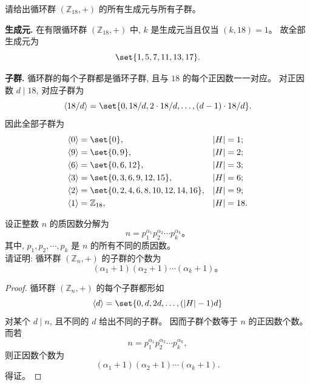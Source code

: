 \documentclass[a4paper, justified]{tufte-handout}
\begin{document}
\begin{problem}
  请给出循环群 $(\mathbb{Z}_{18}, +)$ 的所有生成元与所有子群。
\end{problem}

\begin{solution}
  \textbf{生成元.}
  在有限循环群 $(\mathbb{Z}_{18}, +)$ 中, $k$ 是生成元当且仅当 $(k, 18) = 1$。
  故全部生成元为
  \[
    \set{1, 5, 7, 11, 13, 17}.
  \]

  \textbf{子群.}
  循环群的每个子群都是循环子群, 且与 $18$ 的每个正因数一一对应。
  对正因数 $d \mid 18$, 对应子群为
  \[
    \langle 18/d \rangle = \set{0, 18/d, 2 \cdot 18/d, \dots, (d-1)\cdot 18/d}.
  \]
  因此全部子群为
  \begin{align*}
    \langle 0 \rangle &= \set{0}, && |H| = 1; \\
    \langle 9 \rangle &= \set{0, 9}, && |H| = 2; \\
    \langle 6 \rangle &= \set{0, 6, 12}, && |H| = 3; \\
    \langle 3 \rangle &= \set{0, 3, 6, 9, 12, 15}, && |H| = 6; \\
    \langle 2 \rangle &= \set{0, 2, 4, 6, 8, 10, 12, 14, 16}, && |H| = 9; \\
    \langle 1 \rangle &= \mathbb{Z}_{18}, && |H| = 18.
  \end{align*}
\end{solution}

\begin{problem}
  设正整数 $n$ 的质因数分解为
  \[
    n = p_{1}^{\alpha_{1}} p_{2}^{\alpha_{2}} \cdots p_{k}^{\alpha_{k}}\text{。}
  \]
  其中, $p_{1}, p_{2}, \cdots, p_{k}$ 是 $n$ 的所有不同的质因数。\\[3pt]

  \noindent 请证明: 循环群 $(\mathbb{Z}_{n}, +)$ 的子群的个数为
  \[
    (\alpha_{1} + 1)(\alpha_{2} + 1) \cdots (\alpha_{k} + 1)\text{。}
  \]
\end{problem}

\begin{proof}
  循环群 $(\mathbb{Z}_n,+)$ 的每个子群都形如
  \[
    \langle d \rangle = \set{0, d, 2d, \dots, (|H|-1)d}
  \]
  对某个 $d \mid n$, 且不同的 $d$ 给出不同的子群。
  因而子群个数等于 $n$ 的正因数个数。
  而若
  \[
    n = p_1^{\alpha_1} p_2^{\alpha_2} \cdots p_k^{\alpha_k},
  \]
  则正因数个数为
  \[
    (\alpha_1 + 1)(\alpha_2 + 1) \cdots (\alpha_k + 1).
  \]
  得证。
\end{proof}
\end{document}
